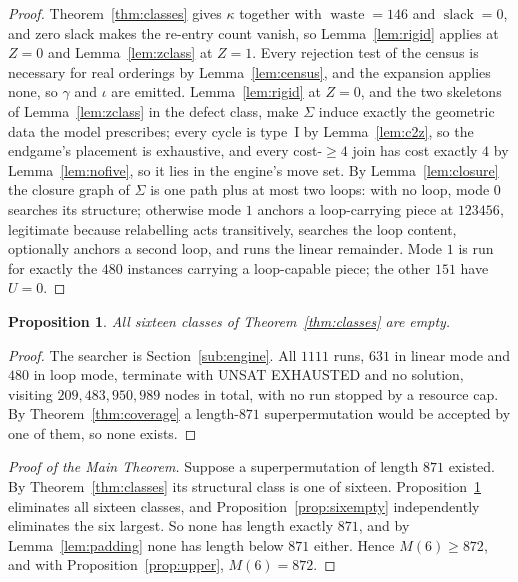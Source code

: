 \documentclass[10pt]{article}
\newtheorem{proposition}[theorem]{Proposition}
\theoremstyle{remark}
\theoremstyle{plain}
\newcommand{\slack}{\operatorname{slack}}
\newcommand{\waste}{\operatorname{waste}}
\begin{document}
\begin{proof}
Theorem~\ref{thm:classes} gives $\kappa$ together with $\waste=146$ and
$\slack=0$, and zero slack makes the re-entry count vanish, so
Lemma~\ref{lem:rigid} applies at $Z=0$ and Lemma~\ref{lem:zclass} at
$Z=1$.  Every rejection test of the census is necessary for real orderings by
Lemma~\ref{lem:census}, and the expansion applies none, so $\gamma$ and
$\iota$ are emitted.  Lemma~\ref{lem:rigid} at $Z=0$, and the two
skeletons of Lemma~\ref{lem:zclass} in the defect class, make $\Sigma$
induce exactly the geometric data the model prescribes; every cycle is type~I by Lemma~\ref{lem:c2z}, so
the endgame's placement is exhaustive, and every cost-$\ge4$ join has
cost exactly $4$ by Lemma~\ref{lem:nofive}, so it lies in the engine's
move set.  By Lemma~\ref{lem:closure} the closure graph of $\Sigma$ is
one path plus at most two loops: with no loop, mode $0$ searches its
structure; otherwise mode $1$ anchors a loop-carrying piece at
$123456$, legitimate because relabelling acts transitively, searches
the loop content, optionally anchors a second loop, and runs the linear
remainder.  Mode $1$ is run for exactly the $480$ instances carrying a
loop-capable piece; the other $151$ have $U=0$.
\end{proof}

\begin{proposition}\label{prop:allempty}
All sixteen classes of Theorem~\ref{thm:classes} are empty.
\end{proposition}

\begin{proof}
The searcher is Section~\ref{sub:engine}.  All $1111$ runs, $631$ in
linear mode and $480$ in loop mode, terminate with
\textsf{UNSAT EXHAUSTED} and no solution, visiting
$209{,}483{,}950{,}989$ nodes in total, with no run stopped by a
resource cap.  By Theorem~\ref{thm:coverage} a length-$871$
superpermutation would be accepted by one of them, so none exists.
\end{proof}

\begin{proof}[Proof of the Main Theorem]
Suppose a superpermutation of length $871$ existed.  By
Theorem~\ref{thm:classes} its structural class is one of sixteen.
Proposition~\ref{prop:allempty} eliminates all sixteen classes, and
Proposition~\ref{prop:sixempty} independently eliminates the six
largest.  So none has length exactly $871$, and by Lemma~\ref{lem:padding} none has
length below $871$ either.  Hence $M(6)\ge 872$, and with
Proposition~\ref{prop:upper}, $M(6)=872$.
\end{proof}
\end{document}
